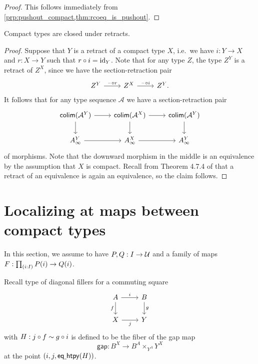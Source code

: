 \begin{proof}
This follows immediately from \cref{prp:pushout_compact,thm:rcoeq_is_pushout}.
\end{proof}

\begin{prp}
Compact types are closed under retracts.
\end{prp}

\begin{proof}
Suppose that $Y$ is a retract of a compact type $X$, i.e.~we have $i:Y\to X$ and $r:X\to Y$ such that $r\circ i={\mathrm{id}_{Y}}$. 
Note that for any type $Z$, the type $Z^Y$ is a retract of $Z^X$, since we have the section-retraction pair
\begin{equation*}
\begin{tikzcd}
Z^Y \arrow[r,"\blank\circ r"] & Z^X \arrow[r,"\blank\circ i"] & Z^Y.
\end{tikzcd}
\end{equation*}
It follows that for any type sequence $\mathcal{A}$ we have a section-retraction pair
\begin{equation*}
\begin{tikzcd}
\tfcolim(\mathcal{A}^Y) \arrow[r] \arrow[d] & \tfcolim(\mathcal{A}^X) \arrow[r] \arrow[d] & \tfcolim(\mathcal{A}^Y) \arrow[d]\\
A_\infty^Y \arrow[r] & A_\infty^X \arrow[r] & A_\infty^Y
\end{tikzcd}
\end{equation*}
of morphisms. Note that the downward morphism in the middle is an equivalence by the assumption that $X$ is compact. Recall from Theorem 4.7.4 of \cite{hottbook} that a retract of an equivalence is again an equivalence, so the claim follows.
\end{proof}

\section{Localizing at maps between compact types}\label{sec:localization_compact}
In this section, we assume to have $P,Q:I\to\mathcal{U}$ and a family of maps $F:\prd{i:I} P(i)\to Q(i)$.

Recall type of diagonal fillers for a commuting square
\begin{equation*}
\begin{tikzcd}
A \arrow[d,swap,"f"] \arrow[r,"i"] & B \arrow[d,"g"] \\
X \arrow[r,swap,"j"] & Y
\end{tikzcd}
\end{equation*}
with $H:j\circ f\sim g\circ i$ is defined to be the fiber of the gap map
\begin{equation*}
\mathsf{gap}:B^X \to B^A\times_{Y^A} Y^X
\end{equation*}
at the point $(i,j,\mathsf{eq\underline{\ }{}htpy}(H))$.

